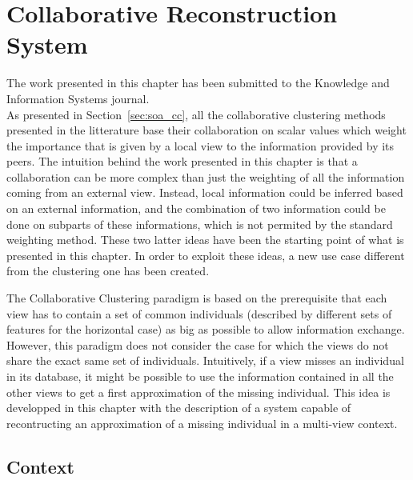 %
\chapter{Collaborative Reconstruction System}

\minitoc{}
\newpage

The work presented in this chapter has been submitted to the Knowledge and Information Systems journal.\\

As presented in Section~\ref{sec:soa_cc}, all the collaborative clustering methods presented in the litterature base their collaboration on scalar values which weight the importance that is given by a local view to the information provided by its peers. The intuition behind the work presented in this chapter is that a collaboration can be more complex than just the weighting of all the information coming from an external view. Instead, local information could be inferred based on an external information, and the combination of two information could be done on subparts of these informations, which is not permited by the standard weighting method. These two latter ideas have been the starting point of what is presented in this chapter. In order to exploit these ideas, a new use case different from the clustering one has been created.

The Collaborative Clustering paradigm is based on the prerequisite that each view has to contain a set of common individuals (described by different sets of features for the horizontal case) as big as possible to allow information exchange. However, this paradigm does not consider the case for which the views do not share the exact same set of individuals. Intuitively, if a view misses an individual in its database, it might be possible to use the information contained in all the other views to get a first approximation of the missing individual. This idea is developped in this chapter with the description of a system capable of recontructing an approximation of a missing individual in a multi-view context.\\

\section{Context}
\label{sec:crs_context}

